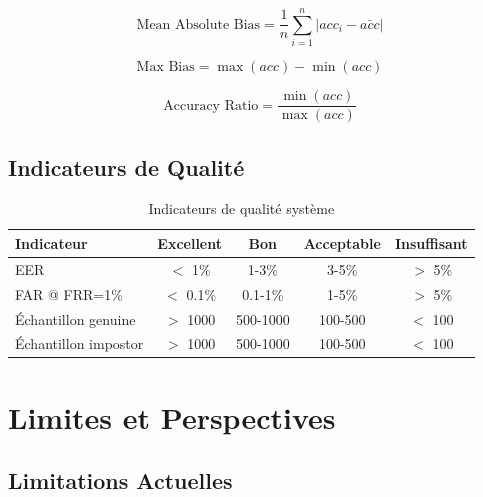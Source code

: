 \documentclass[12pt,a4paper]{report}
\begin{document}
\begin{equation}
    \text{Mean Absolute Bias} = \frac{1}{n} \sum_{i=1}^{n} |acc_i - \bar{acc}|
    \label{eq:mab}
\end{equation}

\begin{equation}
    \text{Max Bias} = \max(acc) - \min(acc)
    \label{eq:maxbias}
\end{equation}

\begin{equation}
    \text{Accuracy Ratio} = \frac{\min(acc)}{\max(acc)}
    \label{eq:accratio}
\end{equation}

\section{Indicateurs de Qualité}

\begin{table}[H]
    \centering
    \caption{Indicateurs de qualité système}
    \label{tab:quality}
    \begin{tabular}{|l|c|c|c|c|}
        \hline
        \textbf{Indicateur} & \textbf{Excellent} & \textbf{Bon} & \textbf{Acceptable} & \textbf{Insuffisant} \\
        \hline
        EER & $<$ 1\% & 1-3\% & 3-5\% & $>$ 5\% \\
        \hline
        FAR @ FRR=1\% & $<$ 0.1\% & 0.1-1\% & 1-5\% & $>$ 5\% \\
        \hline
        Échantillon genuine & $>$ 1000 & 500-1000 & 100-500 & $<$ 100 \\
        \hline
        Échantillon impostor & $>$ 1000 & 500-1000 & 100-500 & $<$ 100 \\
        \hline
    \end{tabular}
\end{table}

\chapter{Limites et Perspectives}

\section{Limitations Actuelles}
\end{document}
